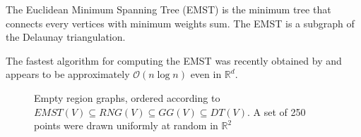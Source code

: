 \begin{defn}
The Euclidean Minimum Spanning Tree (EMST) is the minimum tree that connects every vertices with minimum weights sum. The EMST is a subgraph of the Delaunay triangulation.
\end{defn}

The fastest algorithm for computing the EMST was recently obtained by \cite{March2010} and appears to be approximately $\mathcal{O}(n \log n)$ even in $\mathbb{R}^d$.
 
 \begin{figure}
  \centering
    \caption{Empty region graphs, ordered according to $EMST(V) \subseteq RNG(V) \subseteq GG(V) \subseteq DT(V)$. A set of 250 points were drawn uniformly at random in $\mathbb{R}^2$}
\end{figure}

